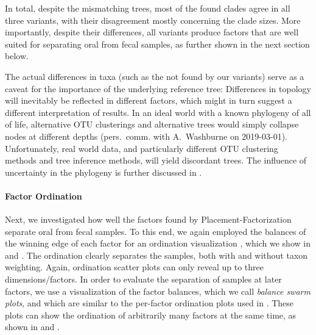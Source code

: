 In total, despite the mismatching trees, most of the found clades agree in all three variants,
with their disagreement mostly concerning the clade sizes.
More importantly, despite their differences,
all variants produce factors that are well suited for separating oral from fecal samples,
as further shown in the next section below. %

The actual differences in taxa (such as the  not found by our variants)
serve as a caveat for the importance of the underlying reference tree:
Differences in topology will inevitably be reflected in different factors,
which might in turn suggest a different interpretation of results.
In an ideal world with a known phylogeny of all of life, alternative OTU clusterings and alternative trees
would simply collapse nodes at different depths (pers.~comm. with A.~Washburne on 2019-03-01).
Unfortunately, real world data, and particularly different OTU clustering methods and tree inference methods,
will yield discordant trees.
The influence of uncertainty in the phylogeny is further discussed in .



\paragraph{Factor Ordination}
\label{sec:Factorization:sub:Evaluation:sub:OralFecalHMPDataset:par:Ordination}

Next, we investigated how well the factors found by Placement-Factorization separate oral from fecal samples.
To this end, we again employed the balances of the winning edge of each factor for an ordination visualization \cite{Washburne2017a},
which we show in 
and .
The ordination clearly separates the samples, both with and without taxon weighting.
Again, ordination scatter plots can only reveal up to three dimensions/factors.
In order to evaluate the separation of samples at later factors,
we use a visualization of the factor balances, which we call \emph{balance swarm plots},
and which are similar to the per-factor ordination plots used in .
These plots can show the ordination of arbitrarily many factors at the same time,
as shown in 
and .


